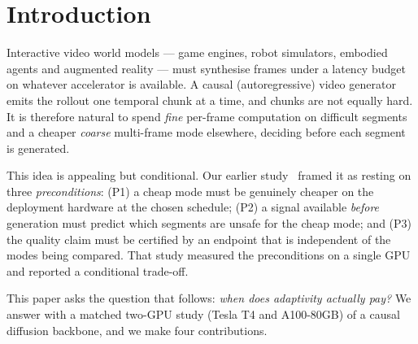 \documentclass[review]{cas-sc}          %
\begin{document}
\maketitle

\section{Introduction}
\label{sec:intro}

Interactive video world models --- game engines, robot simulators, embodied agents and augmented
reality --- must synthesise frames under a latency budget on whatever accelerator is available. A causal
(autoregressive) video generator emits the rollout one temporal chunk at a time, and chunks are not
equally hard. It is therefore natural to spend \emph{fine} per-frame computation on difficult segments
and a cheaper \emph{coarse} multi-frame mode elsewhere, deciding before each segment is generated.

This idea is appealing but conditional. Our earlier study~\citep{hossen2026jevRouted} framed it as
resting on three \emph{preconditions}: (P1) a cheap mode must be genuinely cheaper on the deployment
hardware at the chosen schedule; (P2) a signal available \emph{before} generation must predict which
segments are unsafe for the cheap mode; and (P3) the quality claim must be certified by an endpoint that
is independent of the modes being compared. That study measured the preconditions on a single GPU and
reported a conditional trade-off.

This paper asks the question that follows: \emph{when does adaptivity actually pay?} We answer with a
matched two-GPU study (Tesla T4 and A100-80GB) of a causal diffusion backbone, and we make four
contributions.
\end{document}
